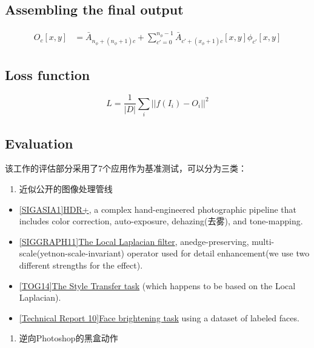 \subsection{Assembling the final output}

$$
\begin{aligned}
O_c[x,y]&=\bar{A}_{n_{\phi}+(n_{\phi} + 1)c} + \sum_{c'=0}^{n_{\phi}-1}\bar{A}_{c'+(x_{\phi}+1)c}[x,y]\phi_{c'}[x,y]
\end{aligned}
$$

\subsection{Loss function}

\[L=\frac{1}{|D|}\sum_{i}||f(I_i)-O_i||^2\]

\subsection{Evaluation}

该工作的评估部分采用了7个应用作为基准测试，可以分为三类：

\begin{enumerate}
\def\labelenumi{\arabic{enumi}.}
\item
  近似公开的图像处理管线
\end{enumerate}

\begin{itemize}
\item
  \href{http://graphics.stanford.edu/papers/hdrp/hasinoff-hdrplus-sigasia16-preprint.pdf}{{[}SIGASIA1{]}HDR+},
  a complex hand-engineered photographic pipeline that includes color
  correction, auto-exposure, dehazing(去雾), and tone-mapping. 
\item
  \href{https://people.csail.mit.edu/sparis/publi/2011/siggraph/Paris_11_Local_Laplacian_Filters_lowres.pdf}{{[}SIGGRAPH11{]}The
  Local Laplacian filter}, anedge-preserving,
  multi-scale(yetnon-scale-invariant) operator used for detail
  enhancement(we use two different strengths for the effect).
\item
  \href{https://www.di.ens.fr/willow/pdfscurrent/Aubry14tog.pdf}{{[}TOG14{]}The
  Style Transfer task} (which happens to be based on the Local
  Laplacian).
\item
  \href{http://vis-www.cs.umass.edu/fddb/fddb.pdf}{{[}Technical Report
  10{]}Face brightening task} using a dataset of labeled faces. 
\end{itemize}

\begin{enumerate}
\def\labelenumi{\arabic{enumi}.}
\item
  逆向Photoshop的黑盒动作
\end{enumerate}

